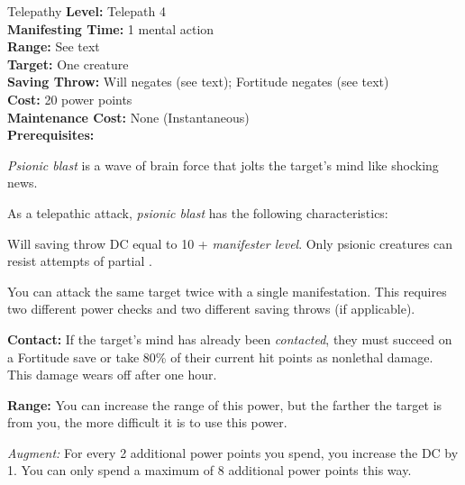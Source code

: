 {Telepathy}
{
	\textbf{Level:}
	Telepath 4\\
	\textbf{Manifesting Time:}
	1 mental action\\
	\textbf{Range:}
	See text\\
	\textbf{Target:}
	One creature\\
	\textbf{Saving Throw:}
	Will negates (see text); Fortitude negates (see text)\\
	\textbf{Cost:}
	20 power points\\
	\textbf{Maintenance Cost:}
	None (Instantaneous)\\
	\textbf{Prerequisites:}
	\\
}
{
	\emph{Psionic blast} is a wave of brain force that jolts the target's mind like shocking news.

	As a telepathic attack, \emph{psionic blast} has the following characteristics:
	\begin{itemize*}
		\item Will saving throw DC equal to 10 + \textit{manifester level}. Only psionic creatures can resist attempts of partial .
		\item You can attack the same target twice with a single manifestation. This requires two different power checks and two different saving throws (if applicable).
	\end{itemize*}

	\textbf{Contact:} If the target's mind has already been \emph{contacted}, they must succeed on a Fortitude save or take 80\% of their current hit points as nonlethal damage. This damage wears off after one hour.
	
	\textbf{Range:} You can increase the range of this power, but the farther the target is from you, the more difficult it is to use this power.


	\textit{Augment:} For every 2 additional power points you spend, you increase the DC by 1. You can only spend a maximum of 8 additional power points this way.
}

